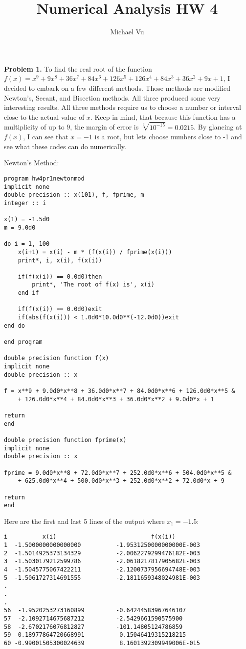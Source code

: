 \documentclass[12pt]{article}
\author{Michael Vu}
\title{Numerical Analysis HW 4}
\begin{document}
\maketitle 

\textbf{Problem 1.} To find the real root of the function $f(x)=x^9 + 9x^8 + 36x^7 + 84x^6 + 126x^5 + 126x^4 + 84x^3 + 36x^2 +9x + 1$, I decided to embark on a few different methods. Those methods are modified Newton's, Secant, and Bisection methods. All three produced some very interesting results. All three methods require us to choose a number or interval close to the actual value of $x$. Keep in mind, that because this function has a multiplicity of up to 9, the margin of error is $\sqrt[9]{10^{-15}}=0.0215$. By glancing at $f(x)$, I can see that $x=-1$ is a root, but lets choose numbers close to -1 and see what these codes can do numerically.

\bigskip
\noindent Newton's Method:
\begin{verbatim}
program hw4pr1newtonmod
implicit none
double precision :: x(101), f, fprime, m
integer :: i 

x(1) = -1.5d0
m = 9.0d0

do i = 1, 100
	x(i+1) = x(i) - m * (f(x(i)) / fprime(x(i)))
	print*, i, x(i), f(x(i))
	
	if(f(x(i)) == 0.0d0)then
		print*, 'The root of f(x) is', x(i)
	end if
	
	if(f(x(i)) == 0.0d0)exit
	if(abs(f(x(i))) < 1.0d0*10.0d0**(-12.0d0))exit
end do

end program

double precision function f(x)
implicit none
double precision :: x

f = x**9 + 9.0d0*x**8 + 36.0d0*x**7 + 84.0d0*x**6 + 126.0d0*x**5 &
	+ 126.0d0*x**4 + 84.0d0*x**3 + 36.0d0*x**2 + 9.0d0*x + 1

return
end

double precision function fprime(x)
implicit none
double precision :: x

fprime = 9.0d0*x**8 + 72.0d0*x**7 + 252.0d0*x**6 + 504.0d0*x**5 &
	+ 625.0d0*x**4 + 500.0d0*x**3 + 252.0d0*x**2 + 72.0d0*x + 9

return
end
\end{verbatim}

\bigskip
\noindent Here are the first and last 5 lines of the output where $x_1=-1.5$:
\begin{verbatim}
i          x(i)                           f(x(i))
1  -1.5000000000000000          -1.9531250000000000E-003
2  -1.5014925373134329          -2.0062279299476182E-003
3  -1.5030179212599786          -2.0618217817905682E-003
4  -1.5045775067422211          -2.1200737956694748E-003
5  -1.5061727314691555          -2.1811659348024981E-003
.
.
.
56  -1.9520253273160899         -0.64244583967646107
57  -2.1092714675687212         -2.5429661590575900
58  -2.6702176076812827         -101.14805124786859
59 -0.18977864720668991          0.15046419315218215
60 -0.99001505300024639          8.1601392309949006E-015
\end{verbatim}
\end{document}
